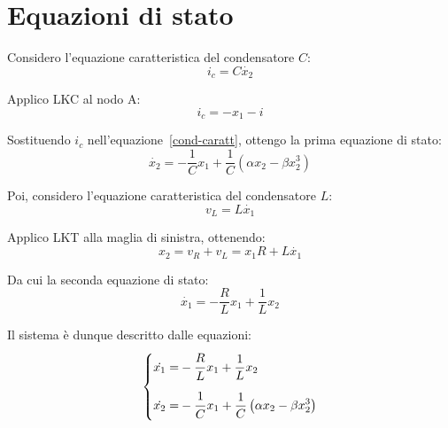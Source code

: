 \section{Equazioni di stato}
Considero l'equazione caratteristica del condensatore $C$:
\begin{equation}
\label{cond-caratt}
i_c = C \dot{x_2}
\end{equation}

Applico LKC al nodo A:
\begin{equation}
i_c = -x_1 - i
\end{equation}

Sostituendo $i_c$ nell'equazione~\ref{cond-caratt}, ottengo la prima equazione di stato:
\begin{equation}
\dot{x_2} = -\frac{1}{C} x_1 + \frac{1}{C}\left( \alpha x_2 - \beta x_2^3\right)
\end{equation}

Poi, considero l'equazione caratteristica del condensatore $L$:
\begin{equation}
\label{ind-caratt}
v_L = L \dot{x_1}
\end{equation}

Applico LKT alla maglia di sinistra, ottenendo:
\begin{equation}
x_2 = v_R + v_L = x_1 R + L \dot{x_1}
\end{equation}

Da cui la seconda equazione di stato:
\begin{equation}
    \dot{x_1} = -\frac{R}{L}x_1 + \frac{1}{L} x_2
\end{equation}

Il sistema è dunque descritto dalle equazioni:
\begin{equation}
    \left\{
    \begin{aligned}
        \dot{x_1} =& -\frac{\strut R}{\strut L}x_1 + \frac{1}{L} x_2\\
        \dot{x_2} =& -\frac{\strut 1}{\strut C} x_1 + \frac{1}{C}\left( \alpha x_2 - \beta x_2^3\right)\\
    \end{aligned}
    \right.
\end{equation}
